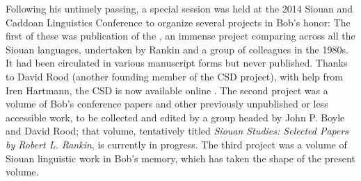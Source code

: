 \begin{refsection}
Following his untimely passing, a special session was held at the 2014 Siouan and Caddoan Linguistics Conference to organize several projects in Bob's honor: The first of these was publication of the , an immense project comparing  across all the Siouan languages, undertaken by Rankin and a group of colleagues in the 1980s. It had been circulated in various manuscript forms but never published. Thanks to David Rood (another founding member of the CSD project), with help from Iren Hartmann, the CSD is now available online \citep{RankinEtAl2015AccessSeptember}. The second project was a volume of Bob's conference papers and other previously unpublished or less accessible work, to be collected and edited by a group headed by John P. Boyle and David Rood; that volume, tentatively titled \textit{Siouan Studies: Selected Papers by Robert L. Rankin}, is currently in progress. The third project was a volume of Siouan linguistic work in Bob's memory, which has taken the shape of the present volume.

{\sloppy
\printbibliography[heading=subbibliography,notkeyword=this]
}
%

\end{refsection}

